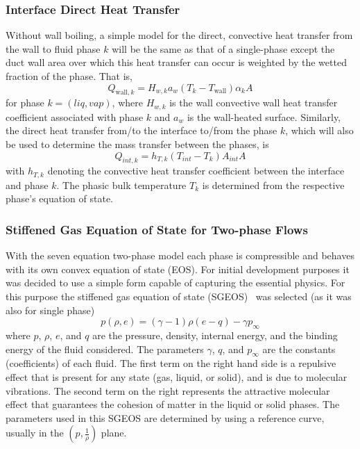 \subsubsection{Interface Direct Heat Transfer}
Without wall boiling, a simple model for the direct, convective heat transfer
from the wall to fluid phase $k$ will be the same as that of a single-phase
except the duct wall area over which this heat transfer can occur is weighted
by the wetted fraction of the phase.  That is,
\begin{equation}
  Q_{ \text{wall}, k } = H_{w,k} a_w \left(T_k  - T_{ \text{wall} } \right) \alpha_k A
\end{equation}
 
for phase $k=(liq, vap)$, where $H_{w,k}$ is the wall convective wall heat transfer
coefficient associated with phase $k$ and $a_w$ is the wall-heated surface. Similarly, the direct heat
transfer from/to the interface to/from the phase $k$, which will also
be used to determine the mass transfer between the phases, is
\begin{equation}
  Q_{int,  k} = h_{T,  k}  \left( T_{int} - T_k \right)  A_{int}  A
\end{equation}
with $h_{T,  k}$ denoting the convective heat transfer coefficient
between the interface and phase $k$. The phasic bulk
temperature $T_k$ is determined from the respective phase's equation of
state.
\subsubsection{Stiffened Gas Equation of State for Two-phase Flows} \label{sec:SGEOS}
With the seven equation two-phase model each phase is compressible and
behaves with its own convex equation of state (EOS).  For initial
development purposes it was decided to use a simple form capable of
capturing the essential physics.  For this purpose the stiffened
gas equation of state (SGEOS)~\cite{SGEOS} was selected (as
it was also for single phase)
\begin{equation}
  \label{E-R:96}
  p(\rho,e) = (\gamma -1) \rho (e - q) - \gamma p_{\infty}
\end{equation}
where $p$, $\rho$, $e$, and $q$ are the pressure, density,
internal energy, and the binding energy of the fluid considered.  The
parameters $\gamma$, $q$, and $p_{\infty}$ are the constants
(coefficients) of each fluid.  The first term on the right hand side
is a repulsive effect that is present for any state (gas, liquid, or
solid), and is due to molecular vibrations.  The second term on the
right represents the attractive molecular effect that guarantees the
cohesion of matter in the liquid or solid phases.  The parameters used
in this SGEOS are determined by using a reference curve, usually in
the $\left(p, \frac{1}{\rho}\right)$ plane.

